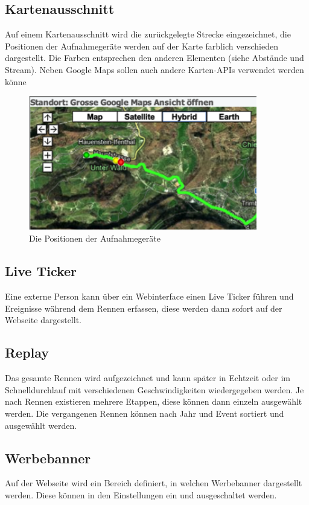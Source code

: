 \subsection{Kartenausschnitt}
Auf einem Kartenausschnitt wird die zurückgelegte Strecke eingezeichnet, die Positionen der Aufnahmegeräte werden auf der Karte farblich verschieden dargestellt. Die Farben entsprechen den anderen Elementen (siehe Abstände und Stream). Neben Google Maps sollen auch andere Karten-APIs verwendet werden könne
\begin{figure}[H]
	\centering
	\includegraphics[width=100mm]{images/tourliveweb/kartenausschnitt.png}
	\caption{Die Positionen der Aufnahmegeräte}
\end{figure}
\subsection{Live Ticker}
Eine externe Person kann über ein Webinterface einen Live Ticker führen und Ereignisse während dem Rennen erfassen, diese werden dann sofort auf der Webseite dargestellt.
\subsection{Replay}
Das gesamte Rennen wird aufgezeichnet und kann später in Echtzeit oder im Schnelldurchlauf mit verschiedenen Geschwindigkeiten wiedergegeben werden. Je nach Rennen existieren mehrere Etappen, diese können dann einzeln ausgewählt werden. Die vergangenen Rennen können nach Jahr und Event sortiert und ausgewählt werden.
\subsection{Werbebanner}
Auf der Webseite wird ein Bereich definiert, in welchen Werbebanner dargestellt werden. Diese können in den Einstellungen ein und ausgeschaltet werden.
